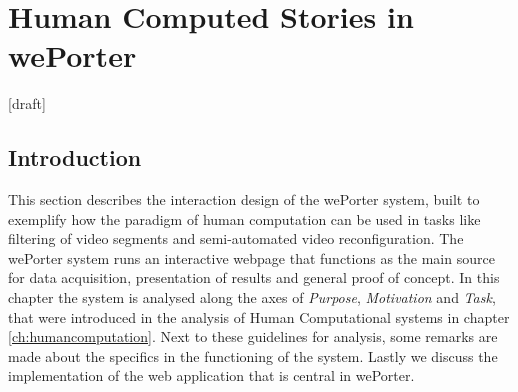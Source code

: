 \chapter{Human Computed Stories in wePorter}
\label{chap:weporter}

[draft]

% 
% 
% 
% 

\section{Introduction}
This section describes the interaction design of the wePorter system, built to exemplify how the paradigm of human computation can be used in tasks like filtering of video segments and semi-automated video reconfiguration. The wePorter system runs an interactive webpage that functions as the main source for data acquisition, presentation of results and general proof of concept. In this chapter the system is analysed along the axes of \textit{Purpose}, \textit{Motivation} and \textit{Task}, that were introduced in the analysis of Human Computational systems in chapter \ref{ch:humancomputation}. Next to these guidelines for analysis, some remarks are made about the specifics in the functioning of the system. Lastly we discuss the implementation of the web application that is central in wePorter.

